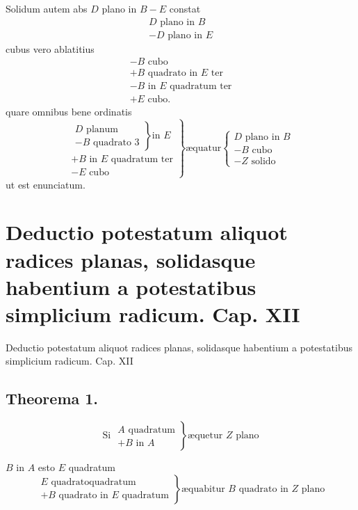 \documentclass[11pt,a4paper]{article}
\begin{document}
Solidum autem abs $D$ plano in $B - E$ constat
\[ \begin{array}{l} D \text{ plano in } B \\ - D \text{ plano in } E \end{array} \]
cubus vero ablatitius
\[ \begin{array}{l} - B \text{ cubo} \\ + B \text{ quadrato in } E \text{ ter} \\ - B \text{ in } E \text{ quadratum ter} \\ + E \text{ cubo.} \end{array} \]
quare omnibus bene ordinatis
\[ \left.\begin{array}{l} \left.\begin{array}{l} D \text{ planum} \\ - B \text{ quadrato } 3 \end{array}\right\} \text{in } E \\ + B \text{ in } E \text{ quadratum ter} \\ - E \text{ cubo} \end{array}\right\} \text{æquatur} \left\{\begin{array}{l} D \text{ plano in } B \\ - B \text{ cubo} \\ - Z \text{ solido} \end{array}\right. \]
ut est enunciatum.

\section*{Deductio potestatum aliquot radices planas, solidasque habentium a potestatibus simplicium radicum. Cap. XII}

Deductio potestatum aliquot radices planas, solidasque habentium a potestatibus simplicium radicum. Cap. XII

\subsection*{Theorema 1.}

\[ \text{Si } \left.\begin{array}{l} A \text{ quadratum} \\ + B \text{ in } A \end{array}\right\} \text{æquetur } Z \text{ plano} \]

$B$ in $A$ esto $E$ quadratum
\[ \left.\begin{array}{l} E \text{ quadratoquadratum} \\ + B \text{ quadrato in } E \text{ quadratum} \end{array}\right\} \text{æquabitur } B \text{ quadrato in } Z \text{ plano} \]
\end{document}
